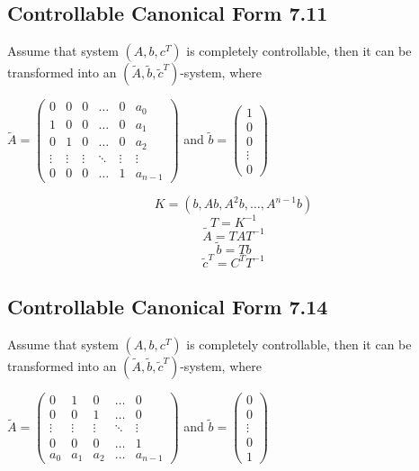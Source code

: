 \documentclass[12pt]{article}
\begin{document}
\subsection*{Controllable Canonical Form 7.11}
Assume that system $(A, b, c^T)$ is completely controllable, then it can be transformed into an $(\tilde{A}, \tilde{b}, \tilde{c}^T)$-system, where \\
\begin{center}
$\tilde{A}=
\begin{pmatrix}
	0 & 0 & 0 & \dots & 0 & a_0 \\
	1 & 0 & 0 & \dots & 0 & a_1 \\
	0 & 1 & 0 & \dots & 0 & a_2 \\
	\vdots & \vdots & \vdots & \ddots & \vdots & \vdots \\
	0 & 0 & 0 & \dots & 1 & a_{n-1} 
\end{pmatrix}$ and 
$\tilde{b}=\begin{pmatrix}
1\\
0\\
0\\
\vdots\\
0
\end{pmatrix}$
\end{center}

$$K=(b,Ab,A^2b,\dots,A^{n-1}b)$$
$$T = K^{-1}$$
$$\tilde{A}=TAT^{-1}$$
$$\tilde{b}=Tb$$
$$\tilde{c}^T=C^TT^{-1}$$

\subsection*{Controllable Canonical Form 7.14}
Assume that system $(A, b, c^T)$ is completely controllable, then it can be transformed into an $(\tilde{A}, \tilde{b}, \tilde{c}^T)$-system, where \\
\begin{center}
$\tilde{A}=
\begin{pmatrix}
	0 & 1 & 0 & \dots & 0 \\
	0 & 0 & 1 & \dots & 0 \\
	\vdots & \vdots & \vdots & \ddots & \vdots \\
	0 & 0 & 0 & \dots & 1 \\
	a_0 & a_1 & a_2 & \dots & a_{n-1} 
\end{pmatrix}$ and 
$\tilde{b}=\begin{pmatrix}
0\\
0\\
\vdots\\
0\\
1
\end{pmatrix}$
\end{center}
\end{document}

